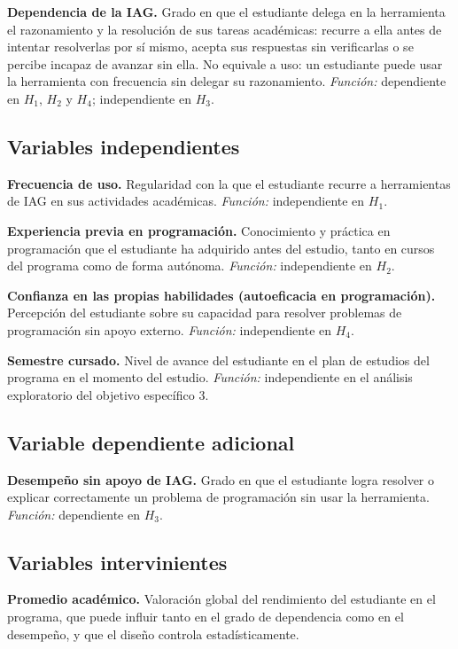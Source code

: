 \documentclass[12pt,letterpaper]{article}
\numberwithin{table}{section}
\numberwithin{figure}{section}
\begin{document}
\textbf{Dependencia de la IAG.} Grado en que el estudiante delega en la herramienta el razonamiento y la resolución de sus tareas académicas: recurre a ella antes de intentar resolverlas por sí mismo, acepta sus respuestas sin verificarlas o se percibe incapaz de avanzar sin ella. No equivale a uso: un estudiante puede usar la herramienta con frecuencia sin delegar su razonamiento. \emph{Función:} dependiente en $H_1$, $H_2$ y $H_4$; independiente en $H_3$.

\subsection{Variables independientes}

\textbf{Frecuencia de uso.} Regularidad con la que el estudiante recurre a herramientas de IAG en sus actividades académicas. \emph{Función:} independiente en $H_1$.

\textbf{Experiencia previa en programación.} Conocimiento y práctica en programación que el estudiante ha adquirido antes del estudio, tanto en cursos del programa como de forma autónoma. \emph{Función:} independiente en $H_2$.

\textbf{Confianza en las propias habilidades (autoeficacia en programación).} Percepción del estudiante sobre su capacidad para resolver problemas de programación sin apoyo externo. \emph{Función:} independiente en $H_4$.

\textbf{Semestre cursado.} Nivel de avance del estudiante en el plan de estudios del programa en el momento del estudio. \emph{Función:} independiente en el análisis exploratorio del objetivo específico 3.

\subsection{Variable dependiente adicional}

\textbf{Desempeño sin apoyo de IAG.} Grado en que el estudiante logra resolver o explicar correctamente un problema de programación sin usar la herramienta. \emph{Función:} dependiente en $H_3$.

\subsection{Variables intervinientes}

\textbf{Promedio académico.} Valoración global del rendimiento del estudiante en el programa, que puede influir tanto en el grado de dependencia como en el desempeño, y que el diseño controla estadísticamente.
\end{document}
